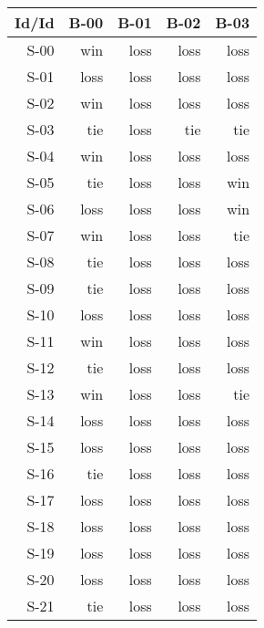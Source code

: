 \begin{tabular}{ | r | r | r | r | r | }
    \hline
        Id/Id  &   B-00  &   B-01  &   B-02  &   B-03  \\
    \hline
    \hline
         S-00  &    win  &   loss  &   loss  &   loss  \\
    \hline
         S-01  &   loss  &   loss  &   loss  &   loss  \\
    \hline
         S-02  &    win  &   loss  &   loss  &   loss  \\
    \hline
         S-03  &    tie  &   loss  &    tie  &    tie  \\
    \hline
         S-04  &    win  &   loss  &   loss  &   loss  \\
    \hline
         S-05  &    tie  &   loss  &   loss  &    win  \\
    \hline
         S-06  &   loss  &   loss  &   loss  &    win  \\
    \hline
         S-07  &    win  &   loss  &   loss  &    tie  \\
    \hline
         S-08  &    tie  &   loss  &   loss  &   loss  \\
    \hline
         S-09  &    tie  &   loss  &   loss  &   loss  \\
    \hline
         S-10  &   loss  &   loss  &   loss  &   loss  \\
    \hline
         S-11  &    win  &   loss  &   loss  &   loss  \\
    \hline
         S-12  &    tie  &   loss  &   loss  &   loss  \\
    \hline
         S-13  &    win  &   loss  &   loss  &    tie  \\
    \hline
         S-14  &   loss  &   loss  &   loss  &   loss  \\
    \hline
         S-15  &   loss  &   loss  &   loss  &   loss  \\
    \hline
         S-16  &    tie  &   loss  &   loss  &   loss  \\
    \hline
         S-17  &   loss  &   loss  &   loss  &   loss  \\
    \hline
         S-18  &   loss  &   loss  &   loss  &   loss  \\
    \hline
         S-19  &   loss  &   loss  &   loss  &   loss  \\
    \hline
         S-20  &   loss  &   loss  &   loss  &   loss  \\
    \hline
         S-21  &    tie  &   loss  &   loss  &   loss  \\

\end{tabular}
